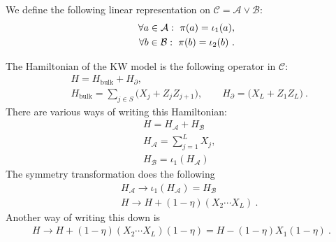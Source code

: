 \documentclass{article}
\newcommand{\mA}{\mathcal{A}}
\newcommand{\mB}{\mathcal{B}}
\newcommand{\mC}{\mathcal{C}}
\newcommand{\mT}{\mathcal{T}}
\theoremstyle{definition}
\begin{document}
  We define the following linear representation on $\mC=\mA\vee \mB$:
  \begin{eqnarray}
    \label{represenC} &&\forall a\in \mA:\ \pi(a)=\iota_1(a),\\
    &&\forall b\in \mB:\ \pi(b)=\iota_2(b)
    \color{black}
    \ .
  \end{eqnarray}

  The Hamiltonian of the KW model is the following operator in $\mC$:
  \begin{eqnarray}
    &&H=H_{\text{bulk}}+H_{\partial},\\
    &&H_{\text{bulk}}=\sum_{j\in S}\bigl(X_j+Z_jZ_{j+1}\bigr),\qquad H_{\partial}=\bigl(X_L+Z_1Z_L\bigr)\ .
  \end{eqnarray}
  There are various ways of writing this Hamiltonian:
  \begin{eqnarray}
    &&H=H_\mA+H_{\mB}\\
    &&H_\mA=\sum_{j=1}^{L}X_j,\qquad \\
    &&H_{\mB}=\iota_1(H_\mA)
  \end{eqnarray}
  The symmetry transformation does the following
  \begin{eqnarray}
    &&H_{\mA}\to \iota_1(H_{\mA})=H_\mB\\
    && H\to H+(1-\eta)(X_2\cdots X_L)\ .
  \end{eqnarray}
  Another way of writing this down is
  \begin{eqnarray}
    H\to H+(1-\eta) (X_2\cdots X_L)(1-\eta)=H-(1-\eta)X_1(1-\eta)\ .
  \end{eqnarray}
\end{document}
